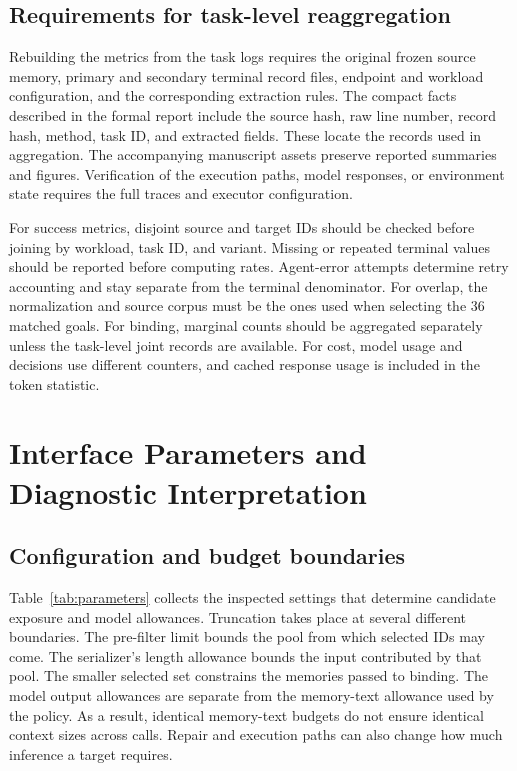 \subsection{Requirements for task-level reaggregation}
Rebuilding the metrics from the task logs requires the original frozen source memory, primary and secondary terminal record files, endpoint and workload configuration, and the corresponding extraction rules. The compact facts described in the formal report include the source hash, raw line number, record hash, method, task ID, and extracted fields. These locate the records used in aggregation. The accompanying manuscript assets preserve reported summaries and figures. Verification of the execution paths, model responses, or environment state requires the full traces and executor configuration.

For success metrics, disjoint source and target IDs should be checked before joining by workload, task ID, and variant. Missing or repeated terminal values should be reported before computing rates. Agent-error attempts determine retry accounting and stay separate from the terminal denominator. For overlap, the normalization and source corpus must be the ones used when selecting the 36 matched goals. For binding, marginal counts should be aggregated separately unless the task-level joint records are available. For cost, model usage and decisions use different counters, and cached response usage is included in the token statistic.

\section{Interface Parameters and Diagnostic Interpretation}
\label{app:interface}

\subsection{Configuration and budget boundaries}
Table~\ref{tab:parameters} collects the inspected settings that determine candidate exposure and model allowances. Truncation takes place at several different boundaries. The pre-filter limit bounds the pool from which selected IDs may come. The serializer's length allowance bounds the input contributed by that pool. The smaller selected set constrains the memories passed to binding. The model output allowances are separate from the memory-text allowance used by the policy. As a result, identical memory-text budgets do not ensure identical context sizes across calls. Repair and execution paths can also change how much inference a target requires.

